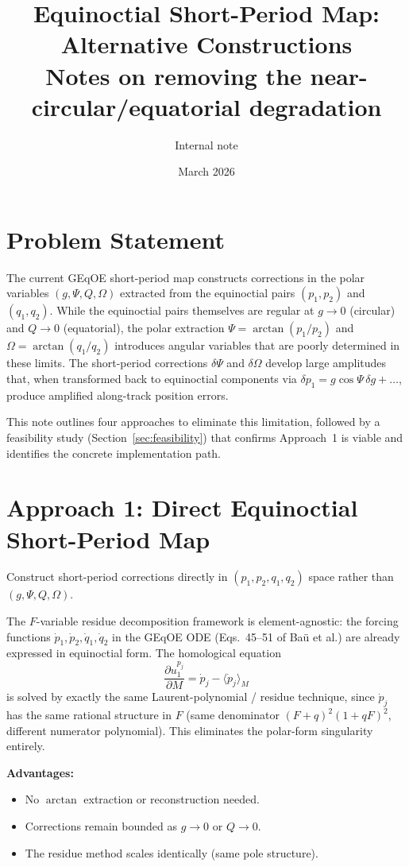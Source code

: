 \documentclass[11pt]{article}
\title{Equinoctial Short-Period Map: Alternative Constructions\\
\large Notes on removing the near-circular/equatorial degradation}
\author{Internal note}
\date{March 2026}
\begin{document}
\maketitle

\section{Problem Statement}

The current GEqOE short-period map constructs corrections in the polar
variables $(g, \Psi, Q, \Omega)$ extracted from the equinoctial pairs
$(p_1, p_2)$ and $(q_1, q_2)$. While the equinoctial pairs themselves are
regular at $g \to 0$ (circular) and $Q \to 0$ (equatorial), the polar
extraction $\Psi = \arctan(p_1/p_2)$ and $\Omega = \arctan(q_1/q_2)$
introduces angular variables that are poorly determined in these limits.
The short-period corrections $\delta\Psi$ and $\delta\Omega$ develop large
amplitudes that, when transformed back to equinoctial components
via $\delta p_1 = g\cos\Psi\,\delta g + \ldots$, produce amplified
along-track position errors.

This note outlines four approaches to eliminate this limitation, followed by
a feasibility study (Section~\ref{sec:feasibility}) that confirms
Approach~1 is viable and identifies the concrete implementation path.

\section{Approach 1: Direct Equinoctial Short-Period Map}

Construct short-period corrections directly in $(p_1, p_2, q_1, q_2)$
space rather than $(g, \Psi, Q, \Omega)$.

The $F$-variable residue decomposition framework is element-agnostic:
the forcing functions $\dot p_1, \dot p_2, \dot q_1, \dot q_2$ in the
GEqOE ODE (Eqs.~45--51 of Ba\"u et al.) are already expressed in
equinoctial form. The homological equation
\[
\frac{\partial u_{1}^{p_j}}{\partial M} = \dot p_j - \langle \dot p_j \rangle_M
\]
is solved by exactly the same Laurent-polynomial / residue technique,
since $\dot p_j$ has the same rational structure in $F$ (same denominator
$(F+q)^2(1+qF)^2$, different numerator polynomial). This eliminates the
polar-form singularity entirely.

\textbf{Advantages:}
\begin{itemize}
\item No $\arctan$ extraction or reconstruction needed.
\item Corrections remain bounded as $g \to 0$ or $Q \to 0$.
\item The residue method scales identically (same pole structure).
\end{itemize}
\end{document}
